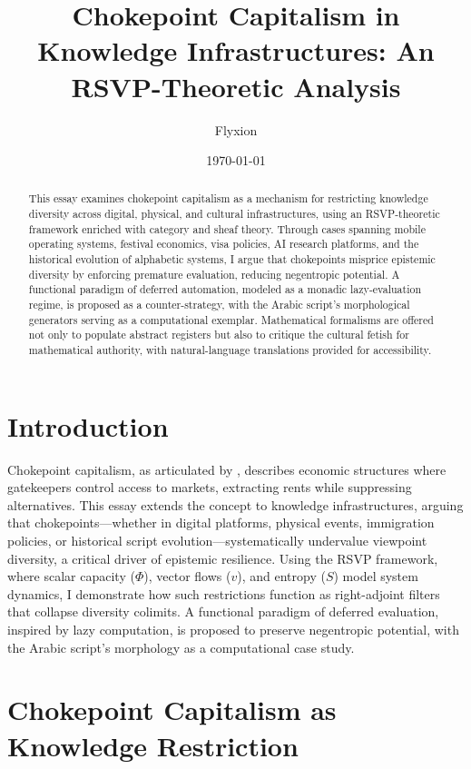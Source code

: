 \documentclass[12pt]{article}
\title{Chokepoint Capitalism in Knowledge Infrastructures: An RSVP-Theoretic Analysis}
\author{Flyxion}
\date{\today}
\theoremstyle{remark}
\begin{document}
\maketitle

\begin{abstract}
This essay examines chokepoint capitalism as a mechanism for restricting knowledge diversity across digital, physical, and cultural infrastructures, using an RSVP-theoretic framework enriched with category and sheaf theory. Through cases spanning mobile operating systems, festival economics, visa policies, AI research platforms, and the historical evolution of alphabetic systems, I argue that chokepoints misprice epistemic diversity by enforcing premature evaluation, reducing negentropic potential. A functional paradigm of deferred automation, modeled as a monadic lazy-evaluation regime, is proposed as a counter-strategy, with the Arabic script’s morphological generators serving as a computational exemplar. Mathematical formalisms are offered not only to populate abstract registers but also to critique the cultural fetish for mathematical authority, with natural-language translations provided for accessibility.
\end{abstract}

\section{Introduction}
Chokepoint capitalism, as articulated by \citet{giblin2022chokepoint}, describes economic structures where gatekeepers control access to markets, extracting rents while suppressing alternatives. This essay extends the concept to knowledge infrastructures, arguing that chokepoints—whether in digital platforms, physical events, immigration policies, or historical script evolution—systematically undervalue viewpoint diversity, a critical driver of epistemic resilience. Using the RSVP framework, where scalar capacity ($\Phi$), vector flows ($v$), and entropy ($S$) model system dynamics, I demonstrate how such restrictions function as right-adjoint filters that collapse diversity colimits. A functional paradigm of deferred evaluation, inspired by lazy computation, is proposed to preserve negentropic potential, with the Arabic script’s morphology as a computational case study.

\section{Chokepoint Capitalism as Knowledge Restriction}
\end{document}
